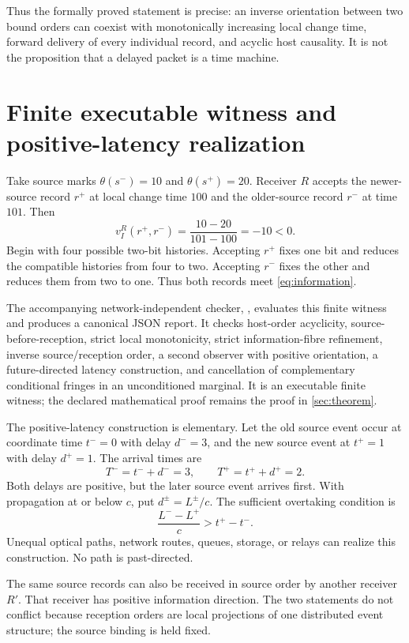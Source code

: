\documentclass[11pt]{article}
\theoremstyle{remark}
\begin{document}
Thus the formally proved statement is precise: an inverse orientation between
two bound orders can coexist with monotonically increasing local change time,
forward delivery of every individual record, and acyclic host causality.  It
is not the proposition that a delayed packet is a time machine.

\section{Finite executable witness and positive-latency realization}
\label{sec:witness}

Take source marks $\theta(s^-)=10$ and $\theta(s^+)=20$.  Receiver $R$
accepts the newer-source record $r^+$ at local change time $100$ and the
older-source record $r^-$ at time $101$.  Then
\[
  v_I^R(r^+,r^-)=\frac{10-20}{101-100}=-10<0.
\]
Begin with four possible two-bit histories.  Accepting $r^+$ fixes one bit and
reduces the compatible histories from four to two.  Accepting $r^-$ fixes the
other and reduces them from two to one.  Thus both records meet
\cref{eq:information}.

The accompanying network-independent checker,
, evaluates this
finite witness and produces a canonical JSON report.  It checks host-order
acyclicity, source-before-reception, strict local monotonicity, strict
information-fibre refinement, inverse source/reception order, a second
observer with positive orientation, a future-directed latency construction,
and cancellation of complementary conditional fringes in an unconditioned
marginal.  It is an executable finite witness; the declared mathematical
proof remains the proof in \cref{sec:theorem}.

The positive-latency construction is elementary.  Let the old source event
occur at coordinate time $t^-=0$ with delay $d^-=3$, and the new source event
at $t^+=1$ with delay $d^+=1$.  The arrival times are
\[
  T^-=t^-+d^-=3,\qquad T^+=t^++d^+=2.
\]
Both delays are positive, but the later source event arrives first.  With
propagation at or below $c$, put $d^\pm=L^\pm/c$.  The sufficient overtaking
condition is
\begin{equation}
  \frac{L^- - L^+}{c}>t^+-t^-.
  \label{eq:latency}
\end{equation}
Unequal optical paths, network routes, queues, storage, or relays can
realize this construction.  No path is past-directed.

The same source records can also be received in source order by another
receiver $R'$.  That receiver has positive information direction.  The two
statements do not conflict because reception orders are local projections of
one distributed event structure; the source binding is held fixed.
\end{document}
